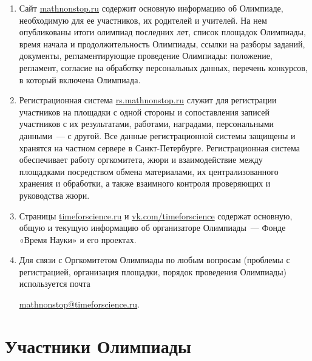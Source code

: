 \documentclass[a4paper,12pt]{article}
\newcommand{\surl}[1]{{\small\url{#1}}}
\begin{document}
\begin{enumerate}
	\item Сайт \surl{mathnonstop.ru} содержит основную информацию об Олимпиаде, необходимую для ее участников, их родителей и учителей. На нем опубликованы итоги олимпиад последних лет, список площадок Олимпиады, время начала и продолжительность Олимпиады, ссылки на разборы заданий, документы, регламентирующие проведение Олимпиады: положение, регламент, согласие на обработку персональных данных, перечень конкурсов, в который включена Олимпиада.
	\item Регистрационная система \surl{rs.mathnonstop.ru} служит для регистрации участников на площадки с одной стороны и сопоставления записей участников с их результатами, работами, наградами, персональными данными~— с другой. Все данные регистрационной системы защищены и хранятся на частном сервере в Санкт-Петербурге. Регистрационная система обеспечивает работу оргкомитета, жюри и взаимодействие между площадками посредством обмена материалами, их централизованного хранения и обработки, а также взаимного контроля проверяющих и руководства жюри.
	\item Страницы \surl{timeforscience.ru} и \surl{vk.com/timeforscience} содержат основную, общую и текущую информацию об организаторе Олимпиады~— Фонде «Время Науки» и его проектах.
	\item Для связи с Оргкомитетом Олимпиады по любым вопросам (проблемы с регистрацией, организация площадки, порядок проведения Олимпиады) используется почта
	\begin{center} \surl{mathnonstop@timeforscience.ru}. \end{center}
\end{enumerate}

\section{Участники Олимпиады}
\end{document}
